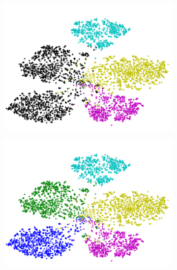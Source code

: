 \documentclass[10pt,twocolumn,letterpaper]{article}
\begin{document}
\begin{figure}[t]
  \centering
  \label{fig:tsne}
  \begin{subfigure}[b]{0.27\linewidth}
    \includegraphics[width=\linewidth]{figure_1}
    \caption{}
    \label{fig:null}
  \end{subfigure}
%
  \begin{subfigure}[b]{0.27\linewidth}
    \includegraphics[width=\linewidth]{figure_1_true}
    \caption{}
    \label{fig:truth}
  \end{subfigure}
%
  \begin{subfigure}[b]{0.27\linewidth}

\end{subfigure}
\end{figure}
\end{document}
